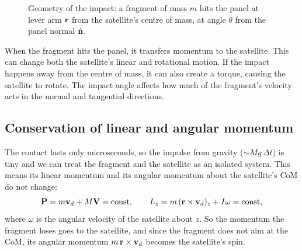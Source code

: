 \begin{figure}[H]
  \centering
  \caption{Geometry of the impact: a fragment of mass $m$ hits the panel at
  lever arm $\mathbf{r}$ from the satellite's centre of mass, at angle
  $\theta$ from the panel normal $\hat{\mathbf{n}}$.}
  \label{fig:geometry}
\end{figure}
When the fragment hits the panel, it transfers momentum to the satellite. This can change both the satellite's linear and rotational motion. If the impact happens away from the centre of mass, it can also create a torque, causing the satellite to rotate. The impact angle affects how much of the fragment's velocity acts in the normal and tangential directions.

\subsection{Conservation of linear and angular momentum}

The contact lasts only microseconds, so the impulse from gravity
($\sim\! M g\,\Delta t$) is tiny and we can treat the fragment and the
satellite as an isolated system. This means its linear momentum and its
angular momentum about the satellite's CoM do not change:
\begin{equation}
  \mathbf{P} = m\mathbf{v}_d + M\mathbf{V} = \text{const},\qquad
  L_z = m\,(\mathbf{r}\times\mathbf{v}_d)_z + I\omega = \text{const},
  \label{eq:conservation}
\end{equation}
where $\omega$ is the angular velocity of the satellite about $z$. So the
momentum the fragment loses goes to the satellite, and since the fragment
does not aim at the CoM, its angular momentum $m\,\mathbf{r}\times\mathbf{v}_d$
becomes the satellite's spin.

